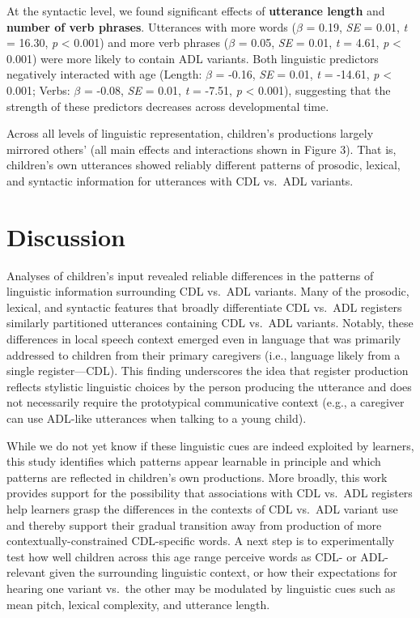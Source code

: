 \documentclass[10pt, letterpaper]{article}
\begin{document}
At the syntactic level, we found significant effects of
\textbf{utterance length} and \textbf{number of verb phrases}.
Utterances with more words (\(\beta\) = 0.19, \emph{SE} = 0.01, \emph{t}
= 16.30, \emph{p} \textless{} 0.001) and more verb phrases (\(\beta\) =
0.05, \emph{SE} = 0.01, \emph{t} = 4.61, \emph{p} \textless{} 0.001)
were more likely to contain ADL variants. Both linguistic predictors
negatively interacted with age (Length: \(\beta\) = -0.16, \emph{SE} =
0.01, \emph{t} = -14.61, \emph{p} \textless{} 0.001; Verbs: \(\beta\) =
-0.08, \emph{SE} = 0.01, \emph{t} = -7.51, \emph{p} \textless{} 0.001),
suggesting that the strength of these predictors decreases across
developmental time.

Across all levels of linguistic representation, children's productions
largely mirrored others' (all main effects and interactions shown in
Figure 3). That is, children's own utterances showed reliably different
patterns of prosodic, lexical, and syntactic information for utterances
with CDL vs.~ADL variants.

\hypertarget{discussion-1}{%
\section{Discussion}\label{discussion-1}}

Analyses of children's input revealed reliable differences in the
patterns of linguistic information surrounding CDL vs.~ADL variants.
Many of the prosodic, lexical, and syntactic features that broadly
differentiate CDL vs.~ADL registers similarly partitioned utterances
containing CDL vs.~ADL variants. Notably, these differences in local
speech context emerged even in language that was primarily addressed to
children from their primary caregivers (i.e., language likely from a
single register---CDL). This finding underscores the idea that register
production reflects stylistic linguistic choices by the person producing
the utterance and does not necessarily require the prototypical
communicative context (e.g., a caregiver can use ADL-like utterances
when talking to a young child).

While we do not yet know if these linguistic cues are indeed exploited
by learners, this study identifies which patterns appear learnable in
principle and which patterns are reflected in children's own
productions. More broadly, this work provides support for the
possibility that associations with CDL vs.~ADL registers help learners
grasp the differences in the contexts of CDL vs.~ADL variant use and
thereby support their gradual transition away from production of more
contextually-constrained CDL-specific words. A next step is to
experimentally test how well children across this age range perceive
words as CDL- or ADL-relevant given the surrounding linguistic context,
or how their expectations for hearing one variant vs.~the other may be
modulated by linguistic cues such as mean pitch, lexical complexity, and
utterance length.
\end{document}
